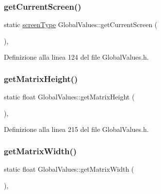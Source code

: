 \subsubsection{\texorpdfstring{get\+Current\+Screen()}{getCurrentScreen()}}
{\footnotesize\ttfamily static \hyperlink{_global_values_8h_a3b1182ff6470e054f713d9ba1d0f9b55}{screen\+Type} Global\+Values\+::get\+Current\+Screen (\begin{DoxyParamCaption}{ }\end{DoxyParamCaption})\hspace{0.3cm}{\ttfamily [inline]}, {\ttfamily [static]}}



Definizione alla linea 124 del file Global\+Values.\+h.

\mbox{\label{class_global_values_a14c43d59d68d43ed3081b98641b8f47c}} 
\subsubsection{\texorpdfstring{get\+Matrix\+Height()}{getMatrixHeight()}}
{\footnotesize\ttfamily static float Global\+Values\+::get\+Matrix\+Height (\begin{DoxyParamCaption}{ }\end{DoxyParamCaption})\hspace{0.3cm}{\ttfamily [inline]}, {\ttfamily [static]}}



Definizione alla linea 215 del file Global\+Values.\+h.

\mbox{\label{class_global_values_a618c0e7f3246edd2a8385c51f2692258}} 
\subsubsection{\texorpdfstring{get\+Matrix\+Width()}{getMatrixWidth()}}
{\footnotesize\ttfamily static float Global\+Values\+::get\+Matrix\+Width (\begin{DoxyParamCaption}{ }\end{DoxyParamCaption})\hspace{0.3cm}{\ttfamily [inline]}, {\ttfamily [static]}}



